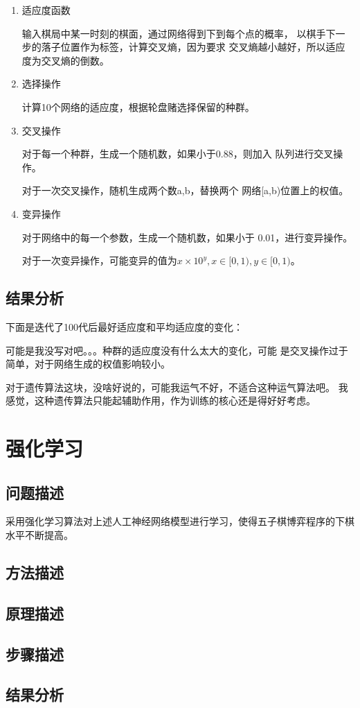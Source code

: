 \documentclass[UTF8]{article}
\begin{document}
\begin{enumerate}
    \item 适应度函数
    
    \subitem 输入棋局中某一时刻的棋面，通过网络得到下到每个点的概率，
    以棋手下一步的落子位置作为标签，计算交叉熵，因为要求
    交叉熵越小越好，所以适应度为交叉熵的倒数。

    \item 选择操作
    
    \subitem 计算10个网络的适应度，根据轮盘赌选择保留的种群。

    \item 交叉操作
    
    \subitem 对于每一个种群，生成一个随机数，如果小于0.88，则加入
    队列进行交叉操作。

    \subitem 对于一次交叉操作，随机生成两个数a,b，替换两个
    网络[a,b)位置上的权值。

    \item 变异操作
    
    \subitem 对于网络中的每一个参数，生成一个随机数，如果小于
    0.01，进行变异操作。

    \subitem 对于一次变异操作，可能变异的值为$x\times10^y,x\in [0,1),y\in [0,1)$。

\end{enumerate}

\subsection{结果分析}

下面是迭代了100代后最好适应度和平均适应度的变化：



可能是我没写对吧。。。种群的适应度没有什么太大的变化，可能
是交叉操作过于简单，对于网络生成的权值影响较小。

对于遗传算法这块，没啥好说的，可能我运气不好，不适合这种运气算法吧。
我感觉，这种遗传算法只能起辅助作用，作为训练的核心还是得好好考虑。

\section{强化学习}
\subsection{问题描述}
采用强化学习算法对上述人工神经网络模型进行学习，使得五子棋博弈程序的下棋
水平不断提高。
\subsection{方法描述}



\subsection{原理描述}

\subsection{步骤描述}

\subsection{结果分析}
\end{document}
